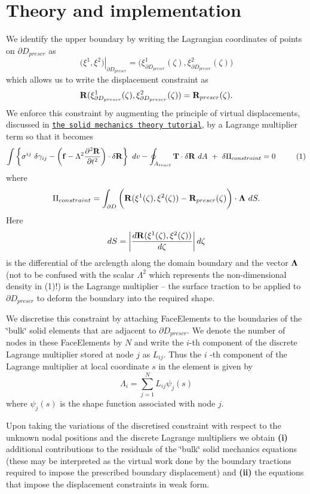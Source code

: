 \hypertarget{index_theory}{}\section{Theory and implementation}\label{index_theory}
We identify the upper boundary by writing the Lagrangian coordinates of points on $ \partial D_{prescr} $ as \[ \left. \big( \xi^1, \xi^2\big)\right|_{\partial D_{prescr}} = \big( \xi^1_{\partial D_{prescr}}(\zeta), \xi^2_{\partial D_{prescr}}(\zeta) \big) \] which allows us to write the displacement constraint as \[ {\bf R}(\xi^1_{\partial D_{prescr}}(\zeta),\xi^2_{\partial D_{prescr}}(\zeta)) = {\bf R}_{prescr}(\zeta). \] We enforce this constraint by augmenting the principle of virtual displacements, discussed in \href{../../solid_theory/html/index.html#equilibrium}{\tt the solid mechanics theory tutorial}, by a Lagrange multiplier term so that it becomes \[ \int \left\{ \sigma^{ij} \ \delta \gamma_{ij} - \left( {\bf f} - \Lambda^2 \frac{\partial^2 {\bf R}}{\partial t^2} \right) \cdot \delta {\bf R} \right\} \ dv - \oint_{A_{tract}} {\bf T} \cdot \delta {\bf R} \ dA \ + \ \delta \Pi_{constraint} = 0 \ \ \ \ \ \ \ \ (1) \] where \[ \Pi_{constraint} = \int_{\partial D} \bigg( {\bf R}(\xi^1(\zeta),\xi^2(\zeta)) - {\bf R}_{prescr}(\zeta) \bigg) \cdot {\bf \Lambda} \ dS. \] Here \[ dS = \left| \frac{d {\bf R}(\xi^1(\zeta),\xi^2(\zeta))}{d \zeta} \right| d\zeta \] is the differential of the arclength along the domain boundary and the vector $ {\bf \Lambda} $ (not to be confused with the scalar $ \Lambda^2 $ which represents the non-\/dimensional density in (1)!) is the Lagrange multiplier -- the surface traction to be applied to $ \partial D_{prescr} $ to deform the boundary into the required shape.

We discretise this constraint by attaching {\ttfamily Face\+Elements} to the boundaries of the \char`\"{}bulk\char`\"{} solid elements that are adjacent to $ \partial D_{prescr} $. We denote the number of nodes in these {\ttfamily Face\+Elements} by $ N $ and write the $ i $-\/th component of the discrete Lagrange multiplier stored at node $ j $ as $ L_{ij} $. Thus the $ i $ -\/th component of the Lagrange multiplier at local coordinate $ s $ in the element is given by \[ \Lambda_i = \sum_{j=1}^{N} L_{ij} \psi_j(s) \] where $ \psi_j(s) $ is the shape function associated with node $ j $.

Upon taking the variations of the discretised constraint with respect to the unknown nodal positions and the discrete Lagrange multipliers we obtain {\bfseries (i)} additional contributions to the residuals of the \char`\"{}bulk\char`\"{} solid mechanics equations (these may be interpreted as the virtual work done by the boundary tractions required to impose the prescribed boundary displacement) and {\bfseries (ii)} the equations that impose the displacement constraints in weak form.

